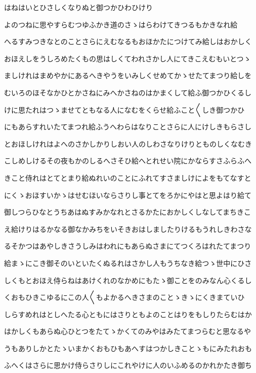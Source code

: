 \documentclass[a4paper,11pt,landscape]{ltjtarticle}
\begin{document}
はねはいとひさしくなりぬと御つかひわひけり
\par\medskip
よのつねに思やすらむつゆふかき道のさゝはらわけてきつるもかきなれ給
\par\medskip
へるすみつきなとのことさらにえむなるもおほかたにつけてみ給しはおかしく
\par\medskip
おほえしをうしろめたくもの思はしくてわれさかし人にてきこえむもいとつゝ
\par\medskip
ましけれはまめやかにあるへきやうをいみしくせめてかゝせたてまつり給しを
\par\medskip
むいろのほそなかひとかさねにみへかさねのはかまくして給ふ御つかひくるし
\par\medskip
けに思たれはつゝませてともなる人になむをくらせ給ふこと〱しき御つかひ
\par\medskip
にもあらすれいたてまつれ給ふうへわらはなりことさらに人にけしきもらさし
\par\medskip
とおほしけれはよへのさかしかりしおい人のしわさなりけりとものしくなむき
\par\medskip
こしめしけるその夜もかのしるへさそひ給へとれせい院にかならすさふらふへ
\par\medskip
きこと侍れはとてとまり給ぬれいのことにふれてすさましけによをもてなすと
\par\medskip
にくゝおほすいかゝはせむほいならさりし事とてをろかにやはと思よはり給て
\par\medskip
御しつらひなとうちあはぬすみかなれとさるかたにおかしくしなしてまちきこ
\par\medskip
え給けりはるかなる御なかみちをいそきおはしましたりけるもうれしきわさな
\par\medskip
るそかつはあやしきさうしみはわれにもあらぬさまにてつくろはれたてまつり
\par\medskip
給まゝにこき御そのいといたくぬるれはさかし人もうちなき給つゝ世中にひさ
\par\medskip
しくもとおほえ侍らねはあけくれのなかめにもたゝ御ことをのみなん心くるし
\par\medskip
くおもひきこゆるにこの人〱もよかるへきさまのことゝきゝにくきまていひ
\par\medskip
しらすめれはとしへたる心ともにはさりともよのことはりをもしりたらむはか
\par\medskip
はかしくもあらぬ心ひとつをたてゝかくてのみやはみたてまつらむと思なるや
\par\medskip
うもありしかとたゝいまかくおもひもあへすはつかしきことゝもにみたれおも
\par\medskip
ふへくはさらに思かけ侍らさりしにこれやけに人のいふめるのかれかたき御ち
\end{document}
